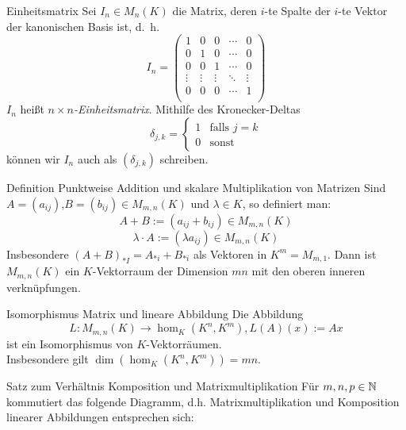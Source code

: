 \documentclass[main.tex]{subfiles}
\begin{document}
\begin{karte}{Einheitsmatrix}
    Sei \( I_n \in M_n(K) \) die Matrix, deren \(i\)-te Spalte 
    der \(i\)-te Vektor der kanonischen Basis ist, d.\ h.\ 
    \[ I_n = 
    \begin{pmatrix}
        1 & 0 & 0 & \cdots & 0 \\
        0 & 1 & 0 & \cdots & 0 \\
        0 & 0 & 1 & \cdots & 0 \\
        \vdots & \vdots & \vdots & \ddots & \vdots \\
        0 & 0 & 0 & \cdots & 1 \\
    \end{pmatrix} \]
    \(I_n\) heißt \textit{\( n \times n \)-Einheitsmatrix}. 
    Mithilfe des Kronecker-Deltas 
    \[ \delta_{j,k} = \begin{cases}
        1 & \text{falls } j = k\\
        0 & \text{sonst}
    \end{cases} \]
    können wir \(I_n\) auch als \( (\delta_{j,k}) \) schreiben.
\end{karte}
\begin{karte}{Definition Punktweise Addition und skalare Multiplikation von Matrizen}
    Sind \(A = (a_{ij})\),\(B = (b_{ij}) \in M_{m,n}(K) \) 
    und \(\lambda \in K\), so definiert man: 
    \[A + B := (a_{ij} + b_{ij}) \in M_{m,n}(K) \]
    \[ \lambda \cdot A := (\lambda a_{ij}) \in M_{m,n}(K) \]
    Insbesondere \({(A + B)}_{*I} = A_{*i} + B_{*i}\) als Vektoren in 
    \(K^m = M_{m,1}\).
    Dann ist \(M_{m,n}(K)\) ein \(K\)-Vektorraum der Dimension \(mn\) 
    mit den oberen inneren verknüpfungen.    
\end{karte}
\begin{karte}{Isomorphismus Matrix und lineare Abbildung}
    Die Abbildung 
    \[ L : M_{m,n}(K) \rightarrow \hom_K(K^n,K^m), 
    L(A)(x) := A x \]
    ist ein Isomorphismus von \(K\)-Vektorräumen.\\
    Insbesondere gilt \( \dim(\hom_K(K^n,K^m)) = mn \).
\end{karte}
\begin{karte}{Satz zum Verhältnis Komposition und Matrixmultiplikation}
    Für \(m,n,p \in \mathbb{N} \) kommutiert das folgende Diagramm, d.h. 
    Matrixmultiplikation und Komposition linearer Abbildungen 
    entsprechen sich: 
\end{karte}
\end{document}
